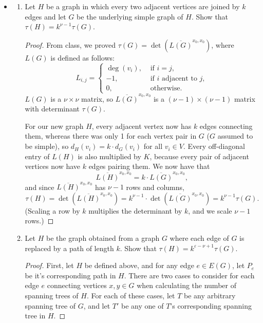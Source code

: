 \documentclass[11pt]{article}
\newcommand\itm[1]{\item[\textbf{#1}]}
\newcommand{\n}{\vspace{0.3cm}}
\begin{document}
\begin{itemize}
  \itm{2.4.5} \begin{enumerate}[label=(\alph*)]
      \item Let \(H\) be a graph in which every two adjacent vertices are joined by \(k\) edges and let \(G\) be the underlying simple graph of \(H\).  Show that \(\tau(H) = k^{\nu-1} \tau(G)\).
        \begin{proof}
          From class, we proved \(\tau(G) = \det \left( \overline{L(G)}^{x_0,x_0} \right)\), where \(L(G)\) is defined as follows:
          \[ L_{i,j} =
            \begin{cases}
            \deg(v_i), &\text{ if } i = j, \\
            -1, &\text{ if } i \text{ adjacent to } j, \\
            0, &\text{ otherwise}.
            \end{cases}
          \]
        \(L(G)\) is a \(\nu \times \nu\) matrix, so \(\overline{L(G)}^{x_0,x_0}\) is a \((\nu-1) \times (\nu-1)\) matrix with determinant \(\tau(G)\). \n

        For our new graph \(H\), every adjacent vertex now has \(k\) edges connecting them, whereas there was only 1 for each vertex pair in \(G\) (\(G\) assumed to be simple), so \(d_H(v_i) = k \cdot d_G(v_i)\) for all \(v_i \in V\).  Every off-diagonal entry of \(L(H)\) is also multiplied by \(K\), because every pair of adjacent vertices now have \(k\) edges pairing them.  We now have that 
        \[\overline{L(H)}^{x_0,x_0} = k \cdot \overline{L(G)}^{x_0,x_0},\]\n
        and since \(\overline{L(H)}^{x_0,x_0}\) has \(\nu - 1\) rows and columns, 
        \[\tau(H) = \det \left( \overline{L(H)}^{x_0,x_0} \right) = k^{\nu-1} \cdot \det \left( \overline{L(G)}^{x_0,x_0} \right) = k^{\nu-1} \tau(G).\]
        (Scaling a row by \(k\) multiplies the determinant by \(k\), and we scale \(\nu - 1\) rows.)
        \end{proof}

      \item Let \(H\) be the graph obtained from a graph \(G\) where each edge of \(G\) is replaced by a path of length \(k\).  Show that \(\tau(H) = k^{\varepsilon - \nu + 1} \tau(G)\).
        \begin{proof}
          First, let \(H\) be defined above, and for any edge \(e \in E(G)\), let \(P_e\) be it's corresponding path in \(H\).  There are two cases to consider for each edge \(e\) connecting vertices \(x,y \in G\) when calculating the number of spanning trees of \(H\).  For each of these cases, let \(T\) be any arbitrary spanning tree of \(G\), and let \(T'\) be any one of \(T\)'s corresponding spanning tree in \(H\). \n


\end{proof}
\end{enumerate}
\end{itemize}
\end{document}
